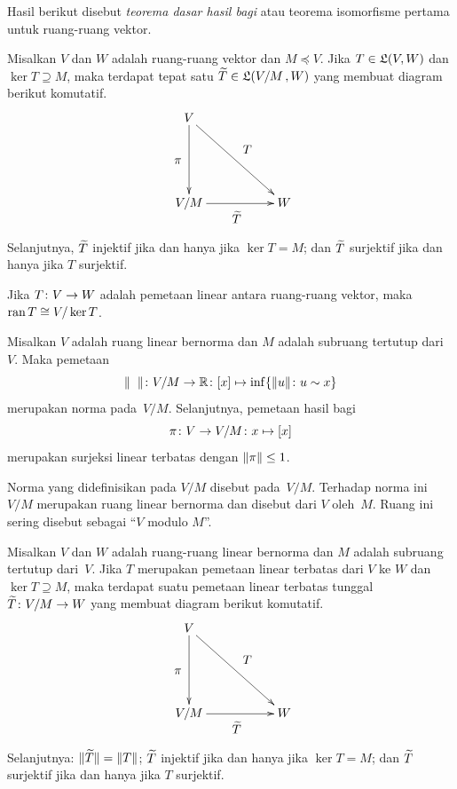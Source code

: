 Hasil berikut disebut \emph{teorema dasar hasil bagi} atau
{teorema isomorfisme pertama} untuk ruang-ruang vektor.

\begin{thm}\label{quo005} Misalkan $V$ dan $W$ adalah ruang-ruang vektor dan $M \preceq V$. Jika
$T \in \mathfrak{L}(V,W)$ dan $\ker T \supseteq M$, maka terdapat tepat satu $\widetilde{T} \in
\mathfrak{L}(V/M\,,W)$ yang membuat diagram berikut komutatif.
 \[\xymatrix@+30pt{V \ar[d]_*+{\pi} \ar[dr]^*+{T} & \\
            V/M \ar[r]_*+{\widetilde T} & W  }\]
Selanjutnya, $\widetilde{T}$ injektif jika dan hanya jika $\ker T = M$; dan $\widetilde{T}$ surjektif
jika dan hanya jika $T$ surjektif.
\end{thm}

\begin{cor} Jika $T\colon V \rightarrow W$ adalah pemetaan linear antara ruang-ruang vektor, maka
$\operatorname{ran} T \cong V/\ker T$.
\end{cor}

\begin{prop}\label{C023711} Misalkan $V$ adalah ruang linear bernorma dan $M$ adalah subruang tertutup
dari~$V$.
Maka pemetaan
  \[ \lVert\hphantom{x}\rVert \colon V/M \rightarrow \mathbb{R} \colon [x]
                        \mapsto \inf\{\lVert u\rVert \colon u \sim x\} \]
merupakan norma pada~$V/M$. Selanjutnya,
pemetaan hasil bagi
  \[ \pi \colon V \rightarrow V/M \colon x \mapsto [x] \]
merupakan surjeksi linear terbatas dengan $\lVert\pi\rVert \le 1$.
\end{prop}

\begin{defn} Norma yang didefinisikan pada $V/M$ disebut
 pada~$V/M$. Terhadap norma ini $V/M$ merupakan ruang linear bernorma dan disebut
 dari $V$ oleh~$M$. Ruang ini sering disebut sebagai ``$V$ modulo $M$''.
\end{defn}

\begin{thm}\label{C023717}
Misalkan $V$ dan $W$ adalah ruang-ruang linear bernorma dan $M$ adalah subruang tertutup dari~$V$. Jika $T$ merupakan
pemetaan linear terbatas dari $V$ ke $W$ dan $\ker T \supseteq M$, maka terdapat suatu
pemetaan linear terbatas tunggal $\widetilde{T}\colon V/M \rightarrow W$ yang membuat diagram berikut komutatif.
  \[ \xymatrix@+30pt{V \ar[d]_*+{\pi} \ar[dr]^*+{T} & \\
             V/M \ar[r]_*+{\wt T} & W  } \]
Selanjutnya: $\lVert\widetilde{T}\rVert = \lVert T\rVert$; $\widetilde{T}$ injektif jika dan hanya jika $\ker T = M$;
dan $\widetilde{T}$ surjektif jika dan hanya jika $T$ surjektif.
\end{thm}

